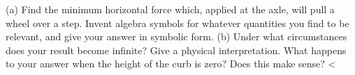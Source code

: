 (a) Find the minimum horizontal force which, applied at
the axle, will pull a wheel over a step. Invent algebra
symbols for whatever quantities you find to be relevant, and
give your answer in symbolic form. \hwendpart
(b) Under what circumstances does your result become
infinite? Give a physical interpretation.
What happens to your answer when the height of the curb is zero? Does this
make sense? <%
